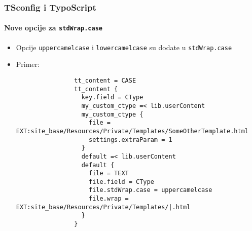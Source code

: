 \begin{frame}[fragile]
	\frametitle{TSconfig i TypoScript}
	\framesubtitle{Nove opcije za \texttt{stdWrap.case}}

	\lstset{basicstyle=\tiny\ttfamily}

	\begin{itemize}

		\item Opcije  \texttt{uppercamelcase} i \texttt{lowercamelcase} su dodate u
			\texttt{stdWrap.case}

		\item Primer:

			\begin{lstlisting}
				tt_content = CASE
				tt_content {
				  key.field = CType
				  my_custom_ctype =< lib.userContent
				  my_custom_ctype {
				    file = EXT:site_base/Resources/Private/Templates/SomeOtherTemplate.html
				    settings.extraParam = 1
				  }
				  default =< lib.userContent
				  default {
				    file = TEXT
				    file.field = CType
				    file.stdWrap.case = uppercamelcase
				    file.wrap = EXT:site_base/Resources/Private/Templates/|.html
				  }
				}
			\end{lstlisting}

	\end{itemize}

\end{frame}


